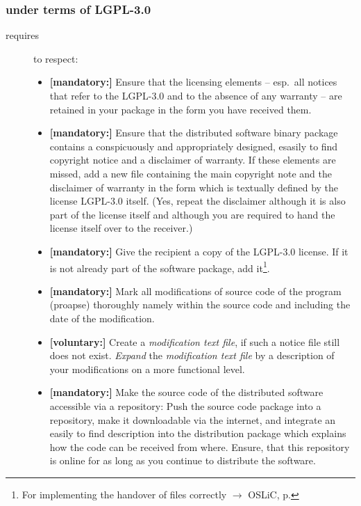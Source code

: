 \subsubsection{under terms of LGPL-3.0}
\begin{description}
\item[requires] to respect:
\begin{itemize}


  \item \textbf{[mandatory:]} Ensure that the licensing elements -- esp.\ all
  notices that refer to the LGPL-3.0 and to the absence of any
  warranty -- are retained in your package in the form you have received them.

  \item \textbf{[mandatory:]} Ensure that the distributed software binary
  package contains a conspicuously and appropriately designed, esasily to find
  copyright notice and a disclaimer of warranty. If these elements are missed,
  add a new file containing the main copyright note and the disclaimer of
  warranty in the form which is textually defined by the license LGPL-3.0
  itself. (Yes, repeat the disclaimer although it is also part of the license
  itself and although you are required to hand the license itself over to the
  receiver.)
  
  \item \textbf{[mandatory:]} Give the recipient a copy of the LGPL-3.0 license.
  If it is not already part of the software package, add it\footnote{For
  implementing the handover of files correctly $\rightarrow$ OSLiC, p.
  \pageref{DistributingFilesHint}}.

  \item \textbf{[mandatory:]} Mark all modifications of source code of the
  program (proapse) thoroughly namely within the source code and including
  the date of the modification.
  
  \item \textbf{[voluntary:]} Create a \emph{modification text file}, if such a
  notice file still does not exist. \emph{Expand} the \emph{modification text
  file} by a description of your modifications on a more functional level.
  
  \item \textbf{[mandatory:]} Make the source code of the distributed software
  accessible via a repository: Push the source code package into a repository,
  make it downloadable via the internet, and integrate an easily to find
  description into the distribution package which explains how the code can be
  received from where. Ensure, that this repository is online for as long as you
  continue to distribute the software.
  

\end{itemize}
\end{description}
